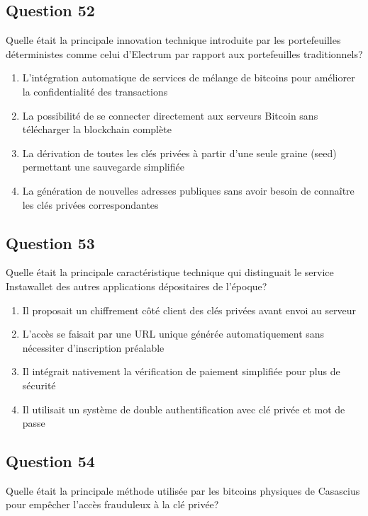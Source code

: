 \documentclass[12pt,a4paper]{article}
\begin{document}
\bigskip


\subsection*{Question 52}
Quelle était la principale innovation technique introduite par les portefeuilles déterministes comme celui d'Electrum par rapport aux portefeuilles traditionnels?

\begin{enumerate}[label=\Alph*., leftmargin=*]
\item L'intégration automatique de services de mélange de bitcoins pour améliorer la confidentialité des transactions
\item La possibilité de se connecter directement aux serveurs Bitcoin sans télécharger la blockchain complète
\item La dérivation de toutes les clés privées à partir d'une seule graine (seed) permettant une sauvegarde simplifiée
\item La génération de nouvelles adresses publiques sans avoir besoin de connaître les clés privées correspondantes
\end{enumerate}

\bigskip


\subsection*{Question 53}
Quelle était la principale caractéristique technique qui distinguait le service Instawallet des autres applications dépositaires de l'époque?

\begin{enumerate}[label=\Alph*., leftmargin=*]
\item Il proposait un chiffrement côté client des clés privées avant envoi au serveur
\item L'accès se faisait par une URL unique générée automatiquement sans nécessiter d'inscription préalable
\item Il intégrait nativement la vérification de paiement simplifiée pour plus de sécurité
\item Il utilisait un système de double authentification avec clé privée et mot de passe
\end{enumerate}

\bigskip


\subsection*{Question 54}
Quelle était la principale méthode utilisée par les bitcoins physiques de Casascius pour empêcher l'accès frauduleux à la clé privée?
\end{document}
